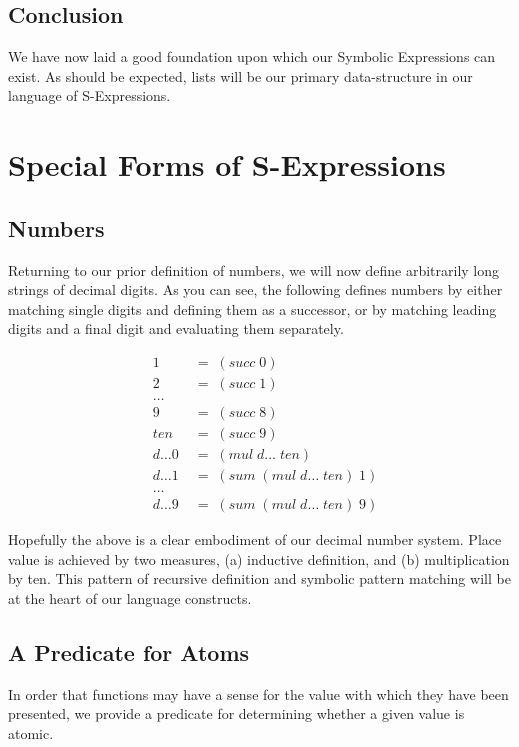 \subsection{Conclusion}
We have now laid a good foundation upon which our Symbolic Expressions can exist. 
As should be expected, lists will be our primary data-structure in our language of 
S-Expressions.

\section{Special Forms of S-Expressions}
\subsection{Numbers}
Returning to our prior definition of numbers, we will now define arbitrarily long 
strings of decimal digits. As you can see, the following defines numbers by either 
matching single digits and defining them as a successor, or by matching leading 
digits and a final digit and evaluating them separately.

\begin{align*}
& 1 \; &= \; (succ \; 0)
\\& 2 \; &= \; (succ \; 1)
\\& \dots
\\& 9 \; &= \; (succ \; 8)
\\& ten \; &= \; (succ \; 9)
\\& d\dots0 \; &= \; (mul \; d\dots \; ten)
\\& d\dots1 \; &= \; (sum \; (mul \; d\dots \; ten) \; 1)
\\& \dots
\\& d\dots9 \; &= \; (sum \; (mul \; d\dots \; ten) \; 9)
\end{align*}

Hopefully the above is a clear embodiment of our decimal number system. Place 
value is achieved by two measures, (a) inductive definition, and (b) 
multiplication by ten. This pattern of recursive definition and symbolic pattern 
matching will be at the heart of our language constructs.

\subsection{A Predicate for Atoms}
In order that functions may have a sense for the value with which they have been 
presented, we provide a predicate for determining whether a given value is atomic.

